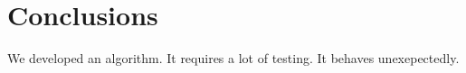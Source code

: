 \documentclass[iop,numberedappendix,apj,onecolumn]{emulateapj}
\begin{document}
\section{Conclusions}
\label{sec:conclusions}

We developed an algorithm. It requires a lot of testing. It behaves unexepectedly.





\label{references}
\end{document}
